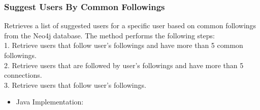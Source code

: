\subsubsection*{Suggest Users By Common Followings}

Retrieves a list of suggested users for a specific user based on common followings from the Neo4j database.
The method performs the following steps:\\
1. Retrieve users that follow user's followings and have more than 5 common followings.\\
2. Retrieve users that are followed by user's followings and have more than 5 connections.\\
3. Retrieve users that follow user's followings.\\
\begin{itemize}
    \item Java Implementation:
\end{itemize}

